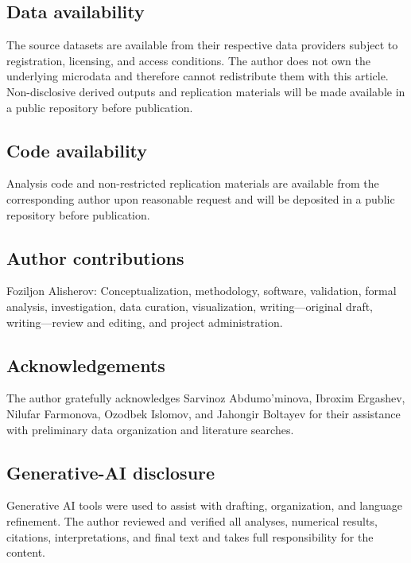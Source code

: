 \documentclass[11pt]{article}
\begin{document}
\subsection*{Data availability}
The source datasets are available from their respective data providers subject to registration, licensing, and access conditions. The author does not own the underlying microdata and therefore cannot redistribute them with this article. Non-disclosive derived outputs and replication materials will be made available in a public repository before publication.

\subsection*{Code availability}
Analysis code and non-restricted replication materials are available from the corresponding author upon reasonable request and will be deposited in a public repository before publication.

\subsection*{Author contributions}
Foziljon Alisherov: Conceptualization, methodology, software, validation, formal analysis, investigation, data curation, visualization, writing---original draft, writing---review and editing, and project administration.

\subsection*{Acknowledgements}

The author gratefully acknowledges Sarvinoz Abdumo'minova, Ibroxim Ergashev,
Nilufar Farmonova, Ozodbek Islomov, and Jahongir Boltayev for their assistance
with preliminary data organization and literature searches.

\subsection*{Generative-AI disclosure}
Generative AI tools were used to assist with drafting, organization, and language refinement. The author reviewed and verified all analyses, numerical results, citations, interpretations, and final text and takes full responsibility for the content.

\printbibliography[title={References}]

\clearpage


\end{document}
